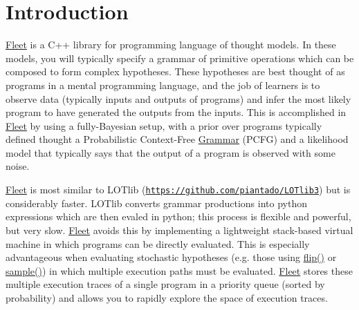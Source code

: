 \hypertarget{index_intro_sec}{}\section{Introduction}\label{index_intro_sec}
\hyperlink{class_fleet}{Fleet} is a C++ library for programming language of thought models. In these models, you will typically specify a grammar of primitive operations which can be composed to form complex hypotheses. These hypotheses are best thought of as programs in a mental programming language, and the job of learners is to observe data (typically inputs and outputs of programs) and infer the most likely program to have generated the outputs from the inputs. This is accomplished in \hyperlink{class_fleet}{Fleet} by using a fully-\/\+Bayesian setup, with a prior over programs typically defined thought a Probabilistic Context-\/\+Free \hyperlink{class_grammar}{Grammar} (P\+C\+FG) and a likelihood model that typically says that the output of a program is observed with some noise.

\hyperlink{class_fleet}{Fleet} is most similar to L\+O\+Tlib (\href{https://github.com/piantado/LOTlib3}{\tt https\+://github.\+com/piantado/\+L\+O\+Tlib3}) but is considerably faster. L\+O\+Tlib converts grammar productions into python expressions which are then evaled in python; this process is flexible and powerful, but very slow. \hyperlink{class_fleet}{Fleet} avoids this by implementing a lightweight stack-\/based virtual machine in which programs can be directly evaluated. This is especially advantageous when evaluating stochastic hypotheses (e.\+g. those using \hyperlink{_random_8h_ae295082303ce2024a3de1c53dc99568e}{flip()} or \hyperlink{_random_8h_ac2ea1cac6b4c8cad207512d19abe42d7}{sample()}) in which multiple execution paths must be evaluated. \hyperlink{class_fleet}{Fleet} stores these multiple execution traces of a single program in a priority queue (sorted by probability) and allows you to rapidly explore the space of execution traces.

